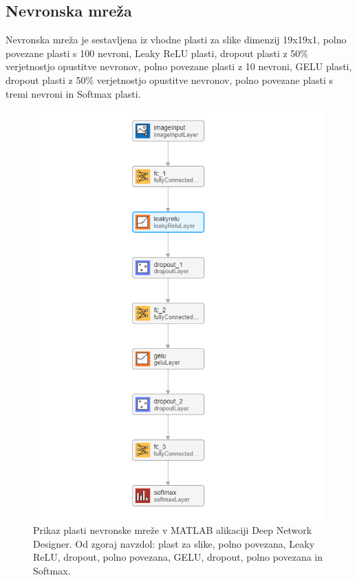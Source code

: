 \subsection{Nevronska mreža}
Nevronska mreža je sestavljena iz vhodne plasti za slike dimenzij 19x19x1, polno povezane plasti s 100 nevroni, Leaky ReLU plasti, dropout plasti z 50\% verjetnostjo opustitve nevronov, polno povezane plasti z 10 nevroni, GELU plasti, dropout plasti z 50\% verjetnostjo opustitve nevronov, polno povezane plasti s tremi nevroni in Softmax plasti. 
\begin{figure}[h!]
\begin{center}
\includegraphics[width=0.8\linewidth]{slike/Neural network.png}
\end{center}
\caption{Prikaz plasti nevronske mreže v MATLAB alikaciji Deep Network Designer. Od zgoraj navzdol: plast za slike, polno povezana, Leaky ReLU, dropout, polno povezana, GELU, dropout, polno povezana in Softmax.}
\end{figure}






